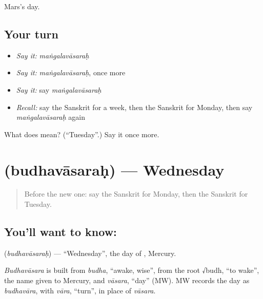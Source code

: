 \begin{grammarlens}[title={What you've built}]
Mars's day.
\end{grammarlens}

\subsection*{Your turn}
\begin{itemize}
\raggedright
  \item \emph{Say it:} \emph{maṅgalavāsaraḥ}
  \item \emph{Say it:} \emph{maṅgalavāsaraḥ}, once more
  \item \emph{Say it:} say \emph{maṅgalavāsaraḥ}
  \item \emph{Recall:} say the Sanskrit for a week, then the Sanskrit for Monday, then say \emph{maṅgalavāsaraḥ} again
\end{itemize}

\begin{tcolorbox}[breakable,colback=teal!4,colframe=teal!35!black,title={Before you move on}]
What does  mean? (\textquotedblleft{}Tuesday\textquotedblright{}.) Say it once more.
\end{tcolorbox}
\section[\texorpdfstring{\sk{बुधवासरः} (budhavāsaraḥ)}{बुधवासरः (budhavāsaraḥ)}]{ (budhavāsaraḥ) — Wednesday}

\label{lesson:SA-C85-wednesday}



\begin{quote}
Before the new one: say the Sanskrit for Monday, then the Sanskrit for Tuesday.
\end{quote}

\subsection*{You'll want to know: }
\textbf{} (\emph{budhavāsaraḥ}) — \textquotedblleft{}Wednesday\textquotedblright{}, the day of \textbf{}, Mercury.

\begin{cousinweb}
\emph{Budhavāsara} is built from \emph{budha}, \textquotedblleft{}awake, wise\textquotedblright{}, from the root √budh, \textquotedblleft{}to wake\textquotedblright{}, the name given to Mercury, and \emph{vāsara}, \textquotedblleft{}day\textquotedblright{} (MW). MW records the day as \emph{budhavāra}, with \emph{vāra}, \textquotedblleft{}turn\textquotedblright{}, in place of \emph{vāsara}.
\end{cousinweb}

